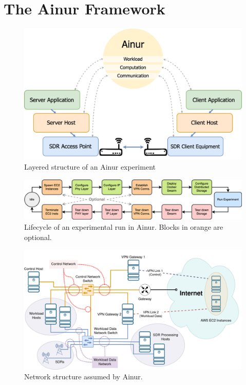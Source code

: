 \section{The Ainur Framework}\label{paper:olguinmunoz2022ainur:ainur}

\begin{figure}[t]
    \centering
    \includegraphics[width=\textwidth]{publications/2022Ainur/figures/overview}
    \caption{Layered structure of an Ainur experiment}\label{paper:olguinmunoz2022ainur:fig:overview}
\end{figure}

\begin{figure}
    \centering
    \includegraphics[width=\textwidth]{publications/2022Ainur/figures/flow2}
    \caption{Lifecycle of an experimental run in Ainur. Blocks in orange are optional.}\label{paper:olguinmunoz2022ainur:fig:flow}
\end{figure}

\begin{figure}
    \centering
    \includegraphics[width=\textwidth]{publications/2022Ainur/figures/network}
    \caption{Network structure assumed by Ainur.}\label{paper:olguinmunoz2022ainur:fig:network}
\end{figure}

